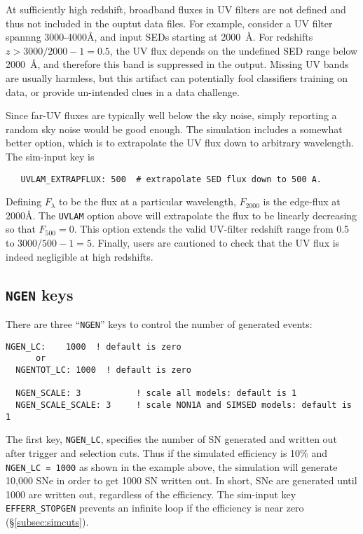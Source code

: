 \documentclass[12pt]{article}
\begin{document}
At sufficiently high redshift, broadband fluxes in UV filters 
are not defined and thus not included in the ouptut data files.
For example, consider a UV filter spannng 3000-4000\AA,
and input SEDs starting at 2000~\AA. 
For redshifts $z> 3000/2000-1 = 0.5$, the UV flux depends
on the undefined SED range  below 2000~\AA, and therefore
this band is suppressed in the output. Missing UV bands are
usually harmless, but this artifact can potentially fool
classifiers training on data, or provide un-intended clues
in a data challenge.  

Since far-UV fluxes are typically well below the sky noise,
simply reporting a random sky noise would be good enough.
The simulation includes a somewhat better option,
which is to extrapolate the UV flux down to arbitrary
wavelength. The sim-input key is
\begin{verbatim}
   UVLAM_EXTRAPFLUX: 500  # extrapolate SED flux down to 500 A.
\end{verbatim}
%
\newcommand{\FLUXLAM}{F_{\lambda}}
\newcommand{\FLUXedge}{F_{2000}}
\newcommand{\FLUXEXTRAP}{F_{500}}
%
Defining $\FLUXLAM$ to be the flux at a particular wavelength,
$\FLUXedge$ is the edge-flux at 2000\AA. The {\tt UVLAM} option 
above will extrapolate the flux
to be linearly decreasing so that $\FLUXEXTRAP=0$.
This option extends the valid UV-filter redshift range from 0.5 to
$3000/500-1 = 5$.
Finally, users are cautioned to check that the UV flux is indeed
negligible at high redshifts.


\clearpage
   \subsection{{\tt NGEN} keys}
   \label{subsec:NGEN}

There are three ``{\tt NGEN}'' keys to control the number
of generated events:

\begin{Verbatim}[frame=single]
  NGEN_LC:    1000  ! default is zero
      or
  NGENTOT_LC: 1000  ! default is zero

  NGEN_SCALE: 3           ! scale all models: default is 1
  NGEN_SCALE_SCALE: 3     ! scale NON1A and SIMSED models: default is 1
\end{Verbatim}
%
The first key, {\tt NGEN\_LC}, specifies the number of SN generated
and written out after trigger and selection cuts. Thus if the simulated
efficiency is 10\% and {\tt NGEN\_LC = 1000} as shown in the example
above, the simulation will generate 10,000 SNe in order to get 1000
SN written out. In short, SNe are generated until 1000 are written out,
regardless of the efficiency.
The sim-input key {\tt EFFERR\_STOPGEN} prevents an infinite 
loop if the efficiency is near zero (\S\ref{subsec:simcuts}).
   
\end{document}
